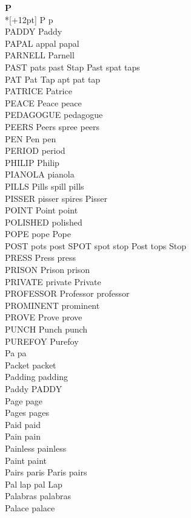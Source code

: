 \vspace{14pt}
\noindent\textbf{\Large P}\\*[+12pt]
P p\\
PADDY Paddy\\
PAPAL appal papal\\
PARNELL Parnell\\
PAST pats past Stap Past spat taps\\
PAT Pat Tap apt pat tap\\
PATRICE Patrice\\
PEACE Peace peace\\
PEDAGOGUE pedagogue\\
PEERS Peers spree peers\\
PEN Pen pen\\
PERIOD period\\
PHILIP Philip\\
PIANOLA pianola\\
PILLS Pills spill pills\\
PISSER pisser spires Pisser\\
POINT Point point\\
POLISHED polished\\
POPE pope Pope\\
POST pots post SPOT spot stop Post tops Stop\\
PRESS Press press\\
PRISON Prison prison\\
PRIVATE private Private\\
PROFESSOR Professor professor\\
PROMINENT prominent\\
PROVE Prove prove\\
PUNCH Punch punch\\
PUREFOY Purefoy\\
Pa pa\\
Packet packet\\
Padding padding\\
Paddy PADDY\\
Page page\\
Pages pages\\
Paid paid\\
Pain pain\\
Painless painless\\
Paint paint\\
Pairs paris Paris pairs\\
Pal lap pal Lap\\
Palabras palabras\\
Palace palace\\
